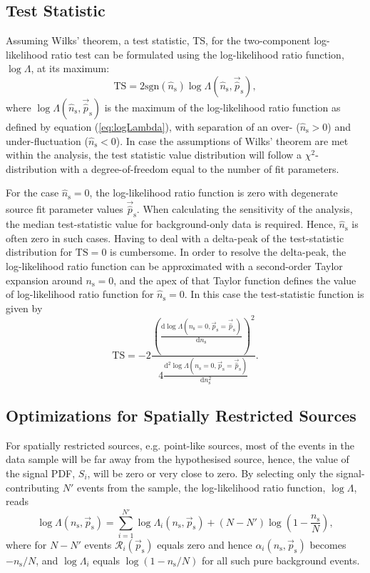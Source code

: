 \documentclass{article}
\newcommand{\ns}{n_{\mathrm{s}}}
\newcommand{\hatns}{\hat{n}_{\mathrm{s}}}
\newcommand{\ps}{\vec{p}_{\mathrm{s}}}
\newcommand{\hatps}{\vec{\hat{p}}_{\mathrm{s}}}
\begin{document}
\subsection{Test Statistic}
\label{sec:teststatistic}

Assuming Wilks' theorem, a test statistic, TS, for the two-component log-likelihood
ratio test can be formulated using the log-likelihood ratio function, $\log\Lambda$,
at its maximum:
\begin{equation}
 \mathrm{TS} = 2\mathrm{sgn}(\hatns) \log \Lambda(\hatns, \hatps),
 \label{eq:TS}
\end{equation}
where $\log \Lambda(\hatns,\hatps)$ is the maximum of the
log-likelihood ratio function as defined by equation (\ref{eq:logLambda}),
with separation of an over- ($\hatns > 0$) and under-fluctuation ($\hatns < 0$).
In case the assumptions of Wilks' theorem are met within the analysis, the test
statistic value distribution will follow a $\chi^2$-distribution with
a degree-of-freedom equal to the number of fit parameters.

For the case $\hatns=0$, the log-likelihood ratio function is zero
with degenerate source fit parameter values $\hatps$.
When calculating the sensitivity of the analysis, the median test-statistic value
for background-only data is required. Hence, $\hatns$ is often zero in such cases.
Having to deal with a delta-peak of the test-statistic distribution
for $\mathrm{TS}=0$ is cumbersome. In order to resolve the delta-peak, the
log-likelihood ratio function can be approximated with a second-order Taylor
expansion around $\ns=0$, and the apex of that Taylor function defines the value of
log-likelihood ratio function for $\hatns=0$. In this case the test-statistic
function is given by
\begin{equation}
 \mathrm{TS} = -2\frac{\left(\frac{\mathrm{d}\log\Lambda(\ns=0,\ps=\hatps)}{\mathrm{d}\ns}\right)^2}{4\frac{\mathrm{d}^2\log\Lambda(\ns=0,\ps=\hatps)}{\mathrm{d}\ns^2}}.
\end{equation}

\subsection{Optimizations for Spatially Restricted Sources}

For spatially restricted sources, e.g. point-like sources, most of the events in
the data sample will be far away from the hypothesised source, hence, the value of the
signal PDF, $S_i$, will be zero or very close to zero. By selecting only
the signal-contributing $N'$ events from the sample, the log-likelihood ratio
function, $\log \Lambda$, reads
\begin{equation}
 \log \Lambda(\ns,\ps) = \sum_{i=1}^{N'} \log \Lambda_i(\ns,\ps) + (N - N')\log(1 - \frac{\ns}{N}),
 \label{eq:logLambdaOfXOptimized}
\end{equation}
where for $N-N'$ events $\mathcal{R}_i(\ps)$ equals zero and hence
$\alpha_i(\ns,\ps)$ becomes $-\ns/N$, and $\log \Lambda_i$ equals $\log(1 - \ns/N)$
for all such pure background events.
\end{document}
